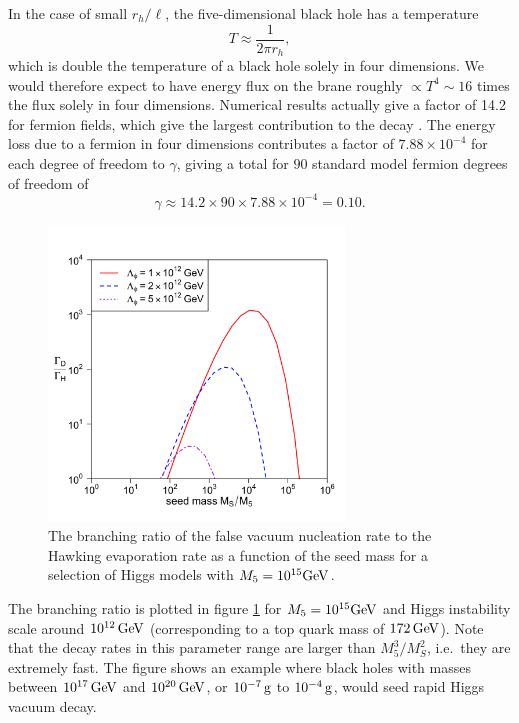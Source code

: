 \documentclass[aps,12pt,prd,superscriptaddress,preprintnumbers, 
	amssymb,
	amsmath,
	notitlepage,
	longbibliography,
	nofootinbib]{revtex4-1}
\begin{document}
In the case of small $r_h/\ell$, the five-dimensional black hole has a temperature
\begin{equation}
T\approx \frac{1}{2\pi r_h},
\end{equation}
which is double the temperature of a black hole solely in four dimensions. 
We would therefore expect to have energy flux on the brane roughly
$\propto T^4\sim 16$ times the flux solely in four dimensions. Numerical
results actually give a factor of 14.2 for fermion fields, which give the 
largest contribution to the decay \cite{Harris:2003eg}. The energy
loss due to a fermion in four dimensions contributes a factor of 
$7.88\times 10^{-4}$ for each degree of freedom to $\gamma$, 
giving a total for $90$ standard model fermion degrees of freedom of
\begin{equation}
\gamma\approx 14.2\times 90\times 7.88\times 10^{-4}=0.10.
\end{equation}
\begin{figure}[htb]
\centering
\includegraphics[width=0.7\textwidth]{Rates.pdf}
\caption{
The branching ratio of the false vacuum nucleation rate to 
the Hawking evaporation rate as a function 
of the seed mass for a selection of Higgs models with $M_5=10^{15}{\rm GeV}$.}
\label{fig:ratio}
\end{figure}

The branching ratio is plotted in figure \ref{fig:ratio} for $M_5=10^{15}{\rm GeV}$ and
Higgs instability scale around $10^{12}\,{\rm GeV}$ (corresponding to a top quark
mass of $172\,{\rm GeV}$). Note that the decay rates in this parameter range are
larger than $M_5^3/M_S^2$, i.e.\ they are extremely fast. The figure shows an example
where black holes with masses between $10^{17}\,{\rm GeV}$ and $10^{20}\,{\rm GeV}$, 
or $10^{-7}\,{\rm g}$ to $10^{-4}\,{\rm g}$, would seed rapid  Higgs vacuum decay. 
\end{document}
